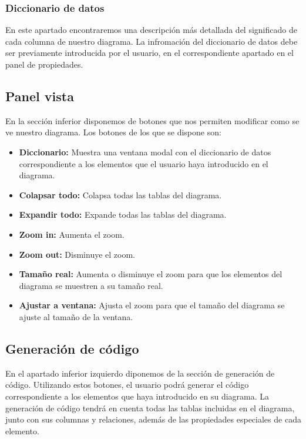 \subsubsection{Diccionario de datos}
En este apartado encontraremos una descripción más detallada del significado de cada columna de nuestro diagrama. La infromación del diccionario de datos debe ser previamente introducida por el usuario, en el correspondiente apartado en el panel de propiedades.

\subsection{Panel vista}


En la sección inferior disponemos de botones que nos permiten modificar como se ve nuestro diagrama. Los botones de los que se dispone son:
\begin{itemize}
    \item \textbf{Diccionario: }Muestra una ventana modal con el diccionario de datos correspondiente a los elementos que el usuario haya introducido en el diagrama.
    \item \textbf{Colapsar todo: }Colapsa todas las tablas del diagrama.
    \item \textbf{Expandir todo: }Expande todas las tablas del diagrama.
    \item \textbf{Zoom in: }Aumenta el zoom.
    \item \textbf{Zoom out: }Disminuye el zoom.
    \item \textbf{Tamaño real: }Aumenta o disminuye el zoom para que los elementos del diagrama se muestren a su tamaño real.
    \item \textbf{Ajustar a ventana: }Ajusta el zoom para que el tamaño del diagrama se ajuste al tamaño de la ventana.
\end{itemize}

\subsection{Generación de código}


En el apartado inferior izquierdo diponemos de la sección de generación de código. Utilizando estos botones, el usuario podrá generar el código correspondiente a los elementos que haya introducido en su diagrama. La generación de código tendrá en cuenta todas las tablas incluidas en el diagrama, junto con sus columnas y relaciones, además de las propiedades especiales de cada elemento.

